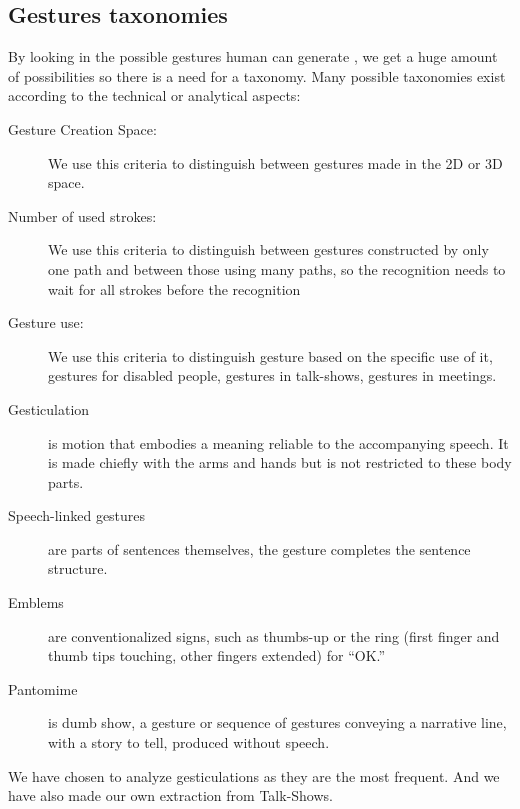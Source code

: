 \documentclass{llncs}
\begin{document}
\subsection{Gestures taxonomies}
By looking in the possible gestures human can generate \cite{Gesturecraft}, we
get a huge amount of possibilities so there is a need for a taxonomy.
Many possible taxonomies exist according to the technical or analytical aspects:
\begin{description}
 \item[Gesture Creation Space:] We use this criteria to distinguish between gestures made in the 2D or 3D space.
 \item[Number of used strokes:] We use this criteria to distinguish between gestures constructed by only one path and between those using many paths, so the recognition needs to wait for all strokes before the recognition
 \item[Gesture use:] We use this criteria to distinguish gesture based on the specific use of it, gestures for disabled people, gestures in talk-shows, gestures in meetings.
\end{description}
\begin{description}
 \item[Gesticulation] is motion that embodies a meaning reliable to the
accompanying speech. It is made chiefly with the arms and hands but is not
restricted to these body parts.
 \item[Speech-linked gestures] are parts of sentences themselves, the gesture completes the sentence structure.
 \item[Emblems] are conventionalized signs, such as thumbs-up or the ring (first
finger and thumb tips touching, other fingers extended) for ``OK.''
 \item[Pantomime] is dumb show, a gesture or sequence of gestures conveying a
narrative line, with a story to tell, produced without speech.
\end{description}


We have chosen to analyze gesticulations as they are the most frequent.
And we have also made our own extraction from Talk-Shows.

\end{document}
